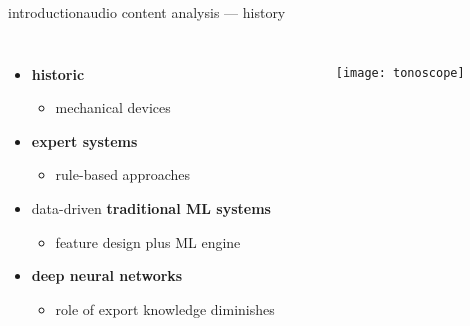         \begin{frame}{introduction}{audio content analysis --- history}
            \begin{columns}
            \begin{itemize}
                \item<1->   \textbf{historic}
                    \begin{itemize}
                        \item   mechanical devices
                    \end{itemize}
                \smallskip
                \item<2->   \textbf{expert systems}
                            \begin{itemize}
                                \item   rule-based approaches
                            \end{itemize}
                \smallskip
                \item<3->   data-driven \textbf{traditional ML systems }
                    \begin{itemize}
                        \item   feature design plus ML engine
                    \end{itemize}
                \smallskip
                \item<4->   \textbf{deep neural networks}
                    \begin{itemize}
                        \item   role of export knowledge diminishes
                    \end{itemize}
            \end{itemize}
                \begin{figure}
                    \texttt{[image: tonoscope]}
                \end{figure}
            \end{columns}
        \end{frame}
        
